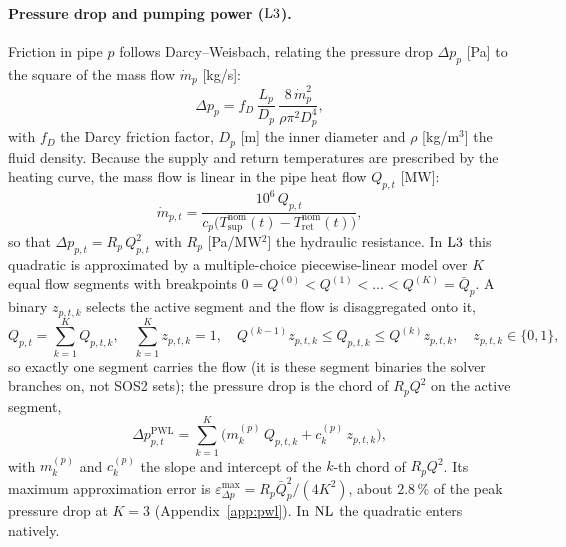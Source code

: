 \paragraph{Pressure drop and pumping power ($\mathrm{L3}$).}
Friction in pipe $p$ follows Darcy--Weisbach, relating the pressure drop $\Delta p_p$ [Pa]
to the square of the mass flow $\dot{m}_p$ [kg/s]:
%
\begin{equation}
  \Delta p_{p} = f_D\, \frac{L_p}{D_p}\,
    \frac{8\,\dot{m}_p^2}{\rho \pi^2 D_p^4},
  \label{eq:darcy}
\end{equation}
%
with $f_D$ the Darcy friction factor, $D_p$ [m] the inner diameter and $\rho$ [kg/m$^3$]
the fluid density. Because the supply and return temperatures are prescribed by the
heating curve, the mass flow is linear in the pipe heat flow $Q_{p,t}$ [MW]:
%
\begin{equation}
  \dot{m}_{p,t} = \frac{10^{6}\, Q_{p,t}}{
    c_p \bigl(T_{\mathrm{sup}}^{\mathrm{nom}}(t)
    - T_{\mathrm{ret}}^{\mathrm{nom}}(t)\bigr)},
  \label{eq:massflow}
\end{equation}
%
so that $\Delta p_{p,t} = R_p\, Q_{p,t}^2$ with $R_p$ [Pa/MW$^2$] the hydraulic resistance.
In $\mathrm{L3}$ this quadratic is approximated by a multiple-choice piecewise-linear model over $K$
equal flow segments with breakpoints $0 = Q^{(0)} < Q^{(1)} < \dots < Q^{(K)} = \bar{Q}_p$. A
binary $z_{p,t,k}$ selects the active segment and the flow is disaggregated onto it,
%
\begin{equation}
  Q_{p,t} = \sum_{k=1}^{K} Q_{p,t,k}, \quad
  \sum_{k=1}^{K} z_{p,t,k} = 1, \quad
  Q^{(k-1)} z_{p,t,k} \le Q_{p,t,k} \le Q^{(k)} z_{p,t,k}, \quad z_{p,t,k} \in \{0,1\},
  \label{eq:pressure_pwl_sel}
\end{equation}
%
so exactly one segment carries the flow (it is these segment binaries the solver branches on,
not SOS2 sets); the pressure drop is the chord of $R_p Q^2$ on the active segment,
%
\begin{equation}
  \Delta p_{p,t}^{\mathrm{PWL}} = \sum_{k=1}^{K}
    \bigl(m_k^{(p)}\, Q_{p,t,k} + c_k^{(p)}\, z_{p,t,k}\bigr),
  \label{eq:pressure_pwl}
\end{equation}
%
with $m_k^{(p)}$ and $c_k^{(p)}$ the slope and intercept of the $k$-th chord of $R_p Q^2$. Its
maximum approximation error is $\varepsilon^{\max}_{\Delta p} = R_p \bar{Q}_p^2/(4K^2)$,
about $2.8$\,\% of the peak pressure drop at $K = 3$ (Appendix~\ref{app:pwl}). In $\mathrm{NL}$
the quadratic enters natively.

